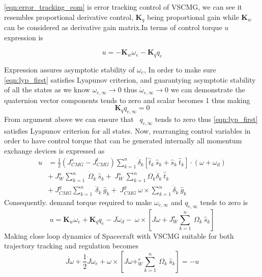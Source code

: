 \autoref{eqn:error_tracking_eom} is error tracking control of VSCMG, we can see it resembles proportional derivative control, $\displaystyle \mathbf{K}_{q}$ being proportional gain while $\displaystyle \mathbf{K}_{w}$ can be considered as derivative gain matrix.In terms of control torque $\displaystyle u$ expression is 
\begin{tcolorbox}
\begin{equation}
u=-\mathbf{K}_{w} \omega _{e} -\mathbf{K}_{q} q_{e}
\end{equation}
\end{tcolorbox}

Expression assures asymptotic stability of $\displaystyle \omega _{e}$, In order to make sure \autoref{eqn:lyp_first} satisfies Lyapunov criterion, and guarantying asymptotic stability of all the states as we know $\displaystyle \omega _{e,\infty }\rightarrow 0$ thus $\displaystyle \dot{\omega }_{e,\infty }\rightarrow 0$ we can demonstrate the quaternion vector components tends to zero and scalar becomes 1 thus making 
\begin{equation}
\mathbf{K}_{q} q_{e,\infty } =0
\end{equation}
From argument above we can ensure that \ $\displaystyle q_{e,\infty }$ tends to zero thus \autoref{eqn:lyp_first} satisfies  Lyapunov  criterion for all states. Now, rearranging control variables in order to have control torque that can be generated internally all momentum exchange devices is expressed as
\begin{equation*}
\begin{aligned}
u & =\frac{1}{2}\left( J^{s}_{CMG} -J^{t}_{CMG}\right)\sum ^{n}_{k=1}\dot{\delta }_{k}[\hat{t}_{k} \ \hat{s}_{k} +\hat{s}_{k} \ \hat{t}_{k}] \cdotp ( \omega +\omega _{d})\\
 & +\ J^{s}_{W}\sum ^{n}_{k=1} \ \dot{\Omega }_{k} \ \hat{s}_{k} +\ J^{s}_{W} \ \sum ^{n}_{k=1} \Omega _{k}\dot{\delta }_{k} \ \hat{t}_{k}\\
 & +\ J^{g}_{CMG}\sum ^{n}_{k=1} \ \ddot{\delta }_{k} \ \hat{g}_{k} +\ J^{g}_{CMG} \ \omega \times \sum ^{n}_{k=1}\dot{\delta }_{k} \ \hat{g}_{k}
\end{aligned}
\end{equation*}
Consequently. demand torque required to make $\displaystyle \omega _{e,\infty }$ and $\displaystyle q_{e,\infty }$ tends to zero is
\begin{equation}
u =\mathbf{K}_{w} \omega _{e} +\mathbf{K}_{q} q_{e} -J\dot{\omega }_{d} -\ \omega \times \left[ J\omega +J^{s}_{W}\sum ^{n}_{k=1} \ \Omega _{k} \ \hat{s}_{k}\right]
\end{equation}
Making close loop dynamics of Spacecraft with VSCMG suitable for both trajectory tracking and regulation becomes
\begin{equation}
\dot{J\omega } +\frac{1}{2}\dot{J} \omega _{e} +\omega \times \left[ J\omega +^{s}_{W}\sum ^{n}_{k=1} \ \Omega _{k} \ \hat{s}_{k}\right] =-u
\end{equation}

